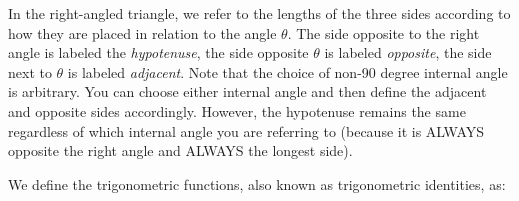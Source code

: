       \par 
      \label{m39408*id79673}In the right-angled triangle, we refer to the lengths of the three sides according to how they are placed in relation to the angle \begin{math}\theta \end{math}. The side opposite to the right angle is labeled the \textsl{hypotenuse}, the side opposite \begin{math}\theta \end{math} is labeled \textsl{opposite}, the side next to \begin{math}\theta \end{math} is labeled \textsl{adjacent}. Note that the choice of non-90 degree internal angle is arbitrary. You can choose either internal angle and then define the adjacent and opposite sides accordingly. However, the hypotenuse remains the same regardless of which internal angle you are referring to (because it is ALWAYS opposite the right angle and ALWAYS the longest side).\par 
      \label{m39408*id79725}We define the trigonometric functions, also known as trigonometric identities, as:
\par 
      \label{m39408*uid21}\nopagebreak\noindent{}
